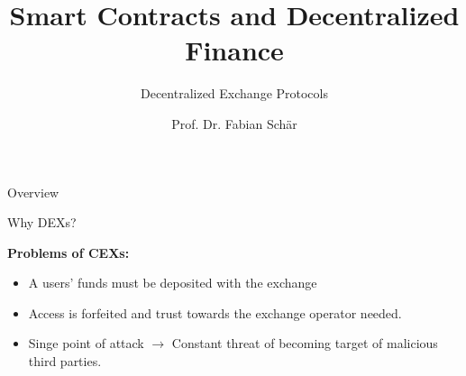 \documentclass[]{beamer}
\title{Smart Contracts and Decentralized Finance}
\subtitle{Decentralized Exchange Protocols}
\author{Prof. Dr. Fabian Schär}
\institute{University of Basel}
\begin{document}
\thispagestyle{empty}
\begin{frame}[noframenumbering]
	\titlepage
\end{frame}

\begin{frame}{Overview}
	\begin{figure}[h!]
		
	\end{figure}
\end{frame}	


\begin{frame}{Why DEXs?}

	\textbf{Problems of CEXs:}
		\begin{small}
		\begin{itemize}
			\item A users' funds must be deposited with the exchange
			\item Access is forfeited and trust towards the exchange operator needed.
			\item Singe point of attack $\rightarrow$ Constant threat of becoming target of malicious third parties.
		\end{itemize}
		\end{small}	

\vspace{1.5em}

\end{frame}
\end{document}
